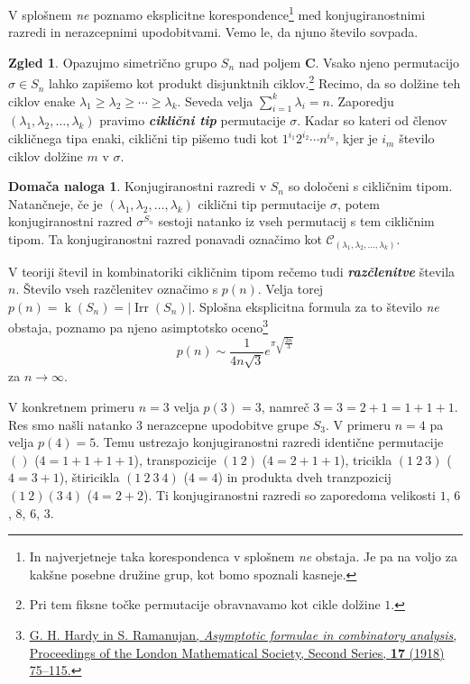 \documentclass[11pt]{book}
\def\CC{\mathbf{C}}
\def\conclass{\mathcal{C}}
\DeclareMathOperator\Irr{Irr}
\DeclareMathOperator\kk{k}
\def\definicija{\color{rdeca}\bf\em}
\theoremstyle{definition}
\theoremstyle{zgled}
\newtheorem*{zgled}{Zgled}
\theoremstyle{odprtproblem}
\theoremstyle{domacanaloga}
\newtheorem*{domacanaloga}{Domača naloga}
\theoremstyle{izrek}
\begin{document}
V splošnem \emph{ne} poznamo eksplicitne korespondence\footnote{In najverjetneje taka korespondenca v splošnem \emph{ne} obstaja. Je pa na voljo za kakšne posebne družine grup, kot bomo spoznali kasneje.}  med konjugiranostnimi razredi in nerazcepnimi upodobitvami. Vemo le, da njuno število sovpada.

\begin{zgled}
Opazujmo simetrično grupo $S_n$ nad poljem $\CC$. Vsako njeno permutacijo $\sigma \in S_n$ lahko zapišemo kot produkt disjunktnih ciklov.\footnote{Pri tem fiksne točke permutacije obravnavamo kot cikle dolžine $1$.} Recimo, da so dolžine teh ciklov enake $\lambda_1 \geq \lambda_2 \geq \cdots \geq \lambda_{k}$. Seveda velja $\sum_{i = 1}^{k} \lambda_i = n$. Zaporedju $(\lambda_1, \lambda_2, \dots, \lambda_{k})$ pravimo {\definicija ciklični tip} permutacije $\sigma$. Kadar so kateri od členov cikličnega tipa enaki, ciklični tip pišemo tudi kot $1^{i_1} 2^{i_2} \cdots n^{i_n}$, kjer je $i_m$ število ciklov dolžine $m$ v $\sigma$.

\begin{domacanaloga}
Konjugiranostni razredi v $S_n$ so določeni s cikličnim tipom. Natančneje, če je $(\lambda_1, \lambda_2, \dots, \lambda_{k})$ ciklični tip permutacije $\sigma$, potem konjugiranostni razred $\sigma^{S_n}$ sestoji natanko iz vseh permutacij s tem cikličnim tipom. Ta konjugiranostni razred ponavadi označimo kot $\conclass_{(\lambda_1, \lambda_2, \dots, \lambda_k)}$.
\end{domacanaloga}

V teoriji števil in kombinatoriki cikličnim tipom rečemo tudi {\definicija razčlenitve} števila $n$. Število vseh razčlenitev označimo s $p(n)$. Velja torej $p(n) = \kk(S_n) = |\Irr(S_n)|$. Splošna eksplicitna formula za to število \emph{ne} obstaja, poznamo pa njeno asimptotsko oceno\footnote{\href{https://academic.oup.com/plms/article-abstract/s2-17/1/75/1536632?redirectedFrom=PDF}{G. H. Hardy in S. Ramanujan, \emph{Asymptotic formulae in combinatory analysis}, Proceedings of the London Mathematical Society, Second Series, \textbf{17} (1918) 75--115.}}
\[
    p(n) \sim \frac{1}{4 n \sqrt{3}} e^{\pi \sqrt{\frac{2n}{3}}}
\]
za $n \to \infty$. 

V konkretnem primeru $n = 3$ velja $p(3) = 3$, namreč $3 = 3 = 2 + 1 = 1 + 1 + 1$. Res smo našli natanko $3$ nerazcepne upodobitve grupe $S_3$. V primeru $n = 4$ pa velja $p(4) = 5$. Temu ustrezajo konjugiranostni razredi identične permutacije $()$ ($4 = 1 + 1 + 1 + 1$), transpozicije $(1 \ 2)$ ($4 = 2 + 1 + 1$), tricikla $(1 \ 2 \ 3)$ ($4 = 3 + 1$), štiricikla $(1 \ 2 \ 3 \ 4)$ ($4 = 4$) in produkta dveh tranzpozicij $(1 \ 2)(3 \ 4)$ ($4 = 2 + 2$). Ti konjugiranostni razredi so zaporedoma velikosti $1$, $6$, $8$, $6$, $3$.
\end{zgled}
\end{document}
